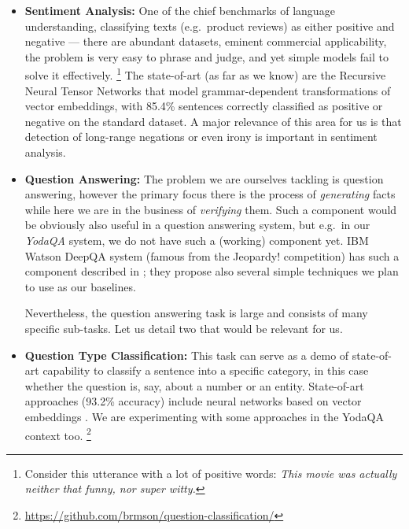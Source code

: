 \documentclass[11pt,a4paper]{article}
\begin{document}
\begin{itemize}
	\item \textbf{Sentiment Analysis:} One of the chief benchmarks of
		language understanding, classifying texts (e.g.\ product
		reviews) as either positive and negative --- there are
		abundant datasets, eminent commercial applicability,
		the problem is very easy to phrase and judge, and yet
		simple models fail to solve it effectively.%
\footnote{Consider this utterance with a lot of positive words:
		\textit{This movie was actually neither that funny, nor super witty.}}
		The state-of-art (as far as we know) are the Recursive
		Neural Tensor Networks that model grammar-dependent
		transformations of vector embeddings, with
		85.4\% sentences correctly classified as positive or
		negative on the standard dataset. \citep{SentimentRNTN}
		A major relevance of this area for us is that detection
		of long-range negations or even irony is important in
		sentiment analysis.

	\item \textbf{Question Answering:} The problem we are ourselves
		tackling is question answering, however the primary focus
		there is the process of \textit{generating} facts while
		here we are in the business of \textit{verifying} them.
		Such a component would be obviously also useful in
		a question answering system, but e.g.\ in our \textit{YodaQA}
		system, we do not have such a (working) component yet.
		IBM Watson DeepQA system (famous from the Jeopardy! competition)
		has such a component described in \citep{WatsonEvidence};
		they propose also several simple techniques we plan to
		use as our baselines.

		Nevertheless, the question answering task is large and
		consists of many specific sub-tasks.  Let us detail two
		that would be relevant for us.

	\item \textbf{Question Type Classification:} This task can serve
		as a demo of state-of-art capability to classify a sentence
		into a specific category, in this case whether the question
		is, say, about a number or an entity.  State-of-art approaches
		(93.2\% accuracy)
		include neural networks based on vector embeddings \citep{QtcDCNN}.
		We are experimenting with some approaches in the YodaQA
		context too.%
\footnote{\url{https://github.com/brmson/question-classification/}}


\end{itemize}
\end{document}
